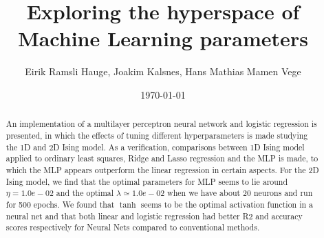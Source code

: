 \documentclass[11pt]{article}
\title{Exploring the hyperspace of Machine Learning parameters}
\author{Eirik Ramsli Hauge, Joakim Kalsnes, Hans Mathias Mamen Vege}
\date{\today}
\begin{document}
\maketitle

\begin{abstract}

An implementation of a multilayer perceptron neural network and logistic regression is presented, in which the effects of tuning different hyperparameters is made studying the 1D and 2D Ising model. As a verification, comparisons between 1D Ising model applied to ordinary least squares, Ridge and Lasso regression and the MLP is made, to which the MLP appears outperform the linear regression in certain aspects. For the 2D Ising model, we find that the optimal parameters for MLP seems to lie around $\eta= 1.0e-02$ and the optimal $\lambda \simeq 1.0e-02$ when we have about 20 neurons and run for 500 epochs. We found that $\tanh$ seems to be the optimal activation function in a neural net and that both linear and logistic regression had better R2 and accuracy scores respectively for Neural Nets compared to conventional methods.

\end{abstract}

%

%

%

%

%

%

%
%


%
\end{document}

